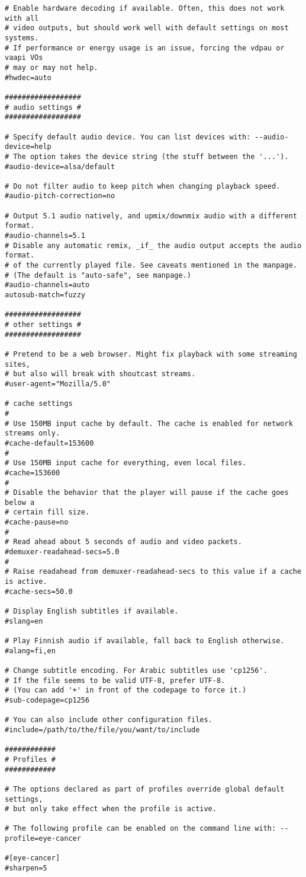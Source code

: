 \documentclass[11pt]{article}
\begin{document}
\begin{lstlisting}
# Enable hardware decoding if available. Often, this does not work with all
# video outputs, but should work well with default settings on most systems.
# If performance or energy usage is an issue, forcing the vdpau or vaapi VOs
# may or may not help.
#hwdec=auto

##################
# audio settings #
##################

# Specify default audio device. You can list devices with: --audio-device=help
# The option takes the device string (the stuff between the '...').
#audio-device=alsa/default

# Do not filter audio to keep pitch when changing playback speed.
#audio-pitch-correction=no

# Output 5.1 audio natively, and upmix/downmix audio with a different format.
#audio-channels=5.1
# Disable any automatic remix, _if_ the audio output accepts the audio format.
# of the currently played file. See caveats mentioned in the manpage.
# (The default is "auto-safe", see manpage.)
#audio-channels=auto
autosub-match=fuzzy

##################
# other settings #
##################

# Pretend to be a web browser. Might fix playback with some streaming sites,
# but also will break with shoutcast streams.
#user-agent="Mozilla/5.0"

# cache settings
#
# Use 150MB input cache by default. The cache is enabled for network streams only.
#cache-default=153600
#
# Use 150MB input cache for everything, even local files.
#cache=153600
#
# Disable the behavior that the player will pause if the cache goes below a
# certain fill size.
#cache-pause=no
#
# Read ahead about 5 seconds of audio and video packets.
#demuxer-readahead-secs=5.0
#
# Raise readahead from demuxer-readahead-secs to this value if a cache is active.
#cache-secs=50.0

# Display English subtitles if available.
#slang=en

# Play Finnish audio if available, fall back to English otherwise.
#alang=fi,en

# Change subtitle encoding. For Arabic subtitles use 'cp1256'.
# If the file seems to be valid UTF-8, prefer UTF-8.
# (You can add '+' in front of the codepage to force it.)
#sub-codepage=cp1256

# You can also include other configuration files.
#include=/path/to/the/file/you/want/to/include

############
# Profiles #
############

# The options declared as part of profiles override global default settings,
# but only take effect when the profile is active.

# The following profile can be enabled on the command line with: --profile=eye-cancer

#[eye-cancer]
#sharpen=5
\end{lstlisting}
\end{document}
